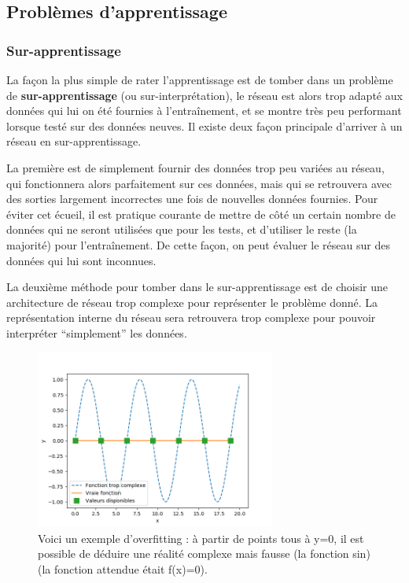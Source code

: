 \subsection{Problèmes d'apprentissage}
\subsubsection{Sur-apprentissage}
La façon la plus simple de rater l'apprentissage est de tomber dans un problème de \textbf{sur-apprentissage} (ou sur-interprétation), le réseau est alors trop adapté aux données qui lui on été fournies à l'entraînement, et se montre très peu performant lorsque testé sur des données neuves. Il existe deux façon principale d'arriver à un réseau en sur-apprentissage.

\par
La première est de simplement fournir des données trop peu variées au réseau, qui fonctionnera alors parfaitement sur ces données, mais qui se retrouvera avec des sorties largement incorrectes une fois de nouvelles données fournies. Pour éviter cet écueil, il est pratique courante de mettre de côté un certain nombre de données qui ne seront utilisées que pour les tests, et d'utiliser le reste (la majorité) pour l'entraînement. De cette façon, on peut évaluer le réseau sur des données qui lui sont inconnues.
\par
La deuxième méthode pour tomber dans le sur-apprentissage est de choisir une architecture de réseau trop complexe pour représenter le problème donné. La représentation interne du réseau sera retrouvera trop complexe pour pouvoir interpréter ``simplement'' les données.

\begin{figure}
    \centering
    \includegraphics[width=0.7\textwidth]{images/graph_overfitting.png}
    \caption{Voici un exemple d'overfitting : à partir de points tous à y=0, il est possible de déduire une réalité complexe mais fausse (la fonction sin) (la fonction attendue était f(x)=0).}
\end{figure}{}



